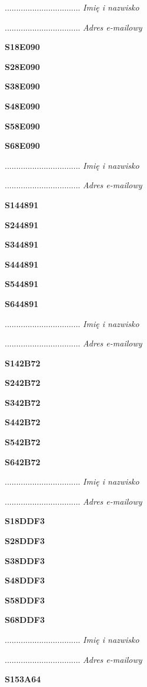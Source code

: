 .................................
\textit{Imię i nazwisko}

.................................
\textit{Adres e-mailowy}

\Large \textbf{S18E090}

\Large \textbf{S28E090}

\Large \textbf{S38E090}

\Large \textbf{S48E090}

\Large \textbf{S58E090}

\Large \textbf{S68E090}

.................................
\textit{Imię i nazwisko}

.................................
\textit{Adres e-mailowy}

\Large \textbf{S144891}

\Large \textbf{S244891}

\Large \textbf{S344891}

\Large \textbf{S444891}

\Large \textbf{S544891}

\Large \textbf{S644891}

.................................
\textit{Imię i nazwisko}

.................................
\textit{Adres e-mailowy}

\Large \textbf{S142B72}

\Large \textbf{S242B72}

\Large \textbf{S342B72}

\Large \textbf{S442B72}

\Large \textbf{S542B72}

\Large \textbf{S642B72}

.................................
\textit{Imię i nazwisko}

.................................
\textit{Adres e-mailowy}

\Large \textbf{S18DDF3}

\Large \textbf{S28DDF3}

\Large \textbf{S38DDF3}

\Large \textbf{S48DDF3}

\Large \textbf{S58DDF3}

\Large \textbf{S68DDF3}

.................................
\textit{Imię i nazwisko}

.................................
\textit{Adres e-mailowy}

\Large \textbf{S153A64}

